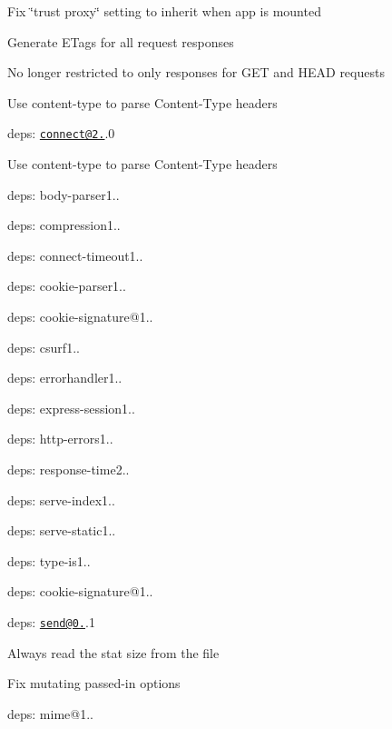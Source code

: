 {\ttfamily 
\begin{DoxyItemize}
\item Fix {\ttfamily \char`\"{}trust proxy\char`\"{}} setting to inherit when app is mounted
\item Generate {\ttfamily E\+Tag}s for all request responses
\begin{DoxyItemize}
\item No longer restricted to only responses for {\ttfamily G\+ET} and {\ttfamily H\+E\+AD} requests
\end{DoxyItemize}
\item Use {\ttfamily content-\/type} to parse {\ttfamily Content-\/\+Type} headers
\item deps\+: \href{mailto:connect@2.29}{\tt connect@2.}.0
\begin{DoxyItemize}
\item Use {\ttfamily content-\/type} to parse {\ttfamily Content-\/\+Type} headers
\item deps\+: body-\/parser1..
\item deps\+: compression1..
\item deps\+: connect-\/timeout1..
\item deps\+: cookie-\/parser1..
\item deps\+: cookie-\/signature@1..
\item deps\+: csurf1..
\item deps\+: errorhandler1..
\item deps\+: express-\/session1..
\item deps\+: http-\/errors1..
\item deps\+: response-\/time2..
\item deps\+: serve-\/index1..
\item deps\+: serve-\/static1..
\item deps\+: type-\/is1..
\end{DoxyItemize}
\item deps\+: cookie-\/signature@1..
\item deps\+: \href{mailto:send@0.12}{\tt send@0.}.1
\begin{DoxyItemize}
\item Always read the stat size from the file
\item Fix mutating passed-\/in {\ttfamily options}
\item deps\+: mime@1..
\end{DoxyItemize}
\end{DoxyItemize}}

